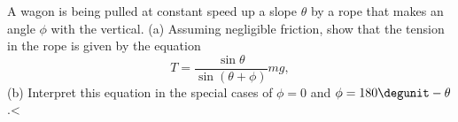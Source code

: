 A wagon is being pulled at constant speed up a slope $\theta$
        by a rope that makes an angle $\phi$ with the vertical. (a)
        Assuming negligible friction, show that the tension in the
        rope is given by the equation
        \begin{equation*}
                T = \frac{\sin\theta}{\sin(\theta+\phi)}mg,
        \end{equation*}\hwendpart
        (b)
        Interpret this equation in the special cases of $\phi=0$ and
        $\phi=180\degunit-\theta$.<%
